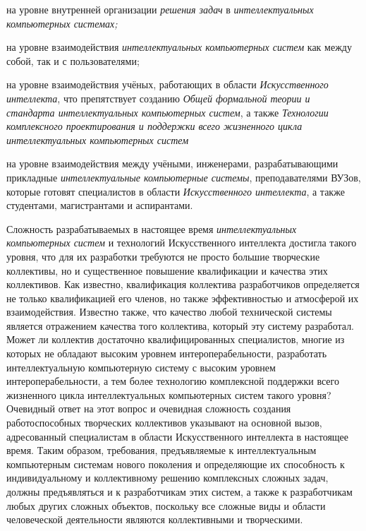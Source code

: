 \begin{textitemize}
	\item
	
	на уровне внутренней организации \textit{решения задач} в \textit{интеллектуальных компьютерных системах;}
	
	\item
	
	на уровне взаимодействия \textit{интеллектуальных компьютерных систем} как между собой, так и с пользователями;
	
	\item
	
	на уровне взаимодействия учёных, работающих в области \textit{Искусственного интеллекта}, что препятствует созданию \textit{Общей формальной теории и стандарта интеллектуальных компьютерных систем}, а также \textit{Технологии комплексного проектирования и поддержки всего жизненного цикла интеллектуальных компьютерных систем}
	
	\item
	
	на уровне взаимодействия между учёными, инженерами, разрабатывающими прикладные \textit{интеллектуальные компьютерные системы}, преподавателями ВУЗов, которые готовят специалистов в области \textit{Искусственного интеллекта}, а также студентами, магистрантами и аспирантами.
	
\end{textitemize}

Сложность разрабатываемых в настоящее время \textit{интеллектуальных компьютерных систем} и технологий Искусственного интеллекта достигла такого уровня, что для их разработки требуются не просто большие творческие коллективы, но и существенное повышение квалификации и качества этих коллективов. Как известно, квалификация коллектива разработчиков определяется не только квалификацией его членов, но также эффективностью и атмосферой их взаимодействия. Известно также, что качество любой технической системы является отражением качества того коллектива, который эту систему разработал. Может ли коллектив достаточно квалифицированных специалистов, многие из которых не обладают высоким уровнем интероперабельности, разработать интеллектуальную компьютерную систему с высоким уровнем интероперабельности, а тем более технологию комплексной поддержки всего жизненного цикла интеллектуальных компьютерных систем такого уровня? Очевидный ответ на этот вопрос и очевидная сложность создания работоспособных творческих коллективов указывают на основной вызов, адресованный специалистам в области Искусственного интеллекта в настоящее время. Таким образом, требования, предъявляемые к интеллектуальным компьютерным системам нового поколения и определяющие их способность к индивидуальному и коллективному решению комплексных сложных задач, должны предъявляться и к разработчикам этих систем, а также к разработчикам любых других сложных объектов, поскольку все сложные виды и области человеческой деятельности являются коллективными и творческими.

